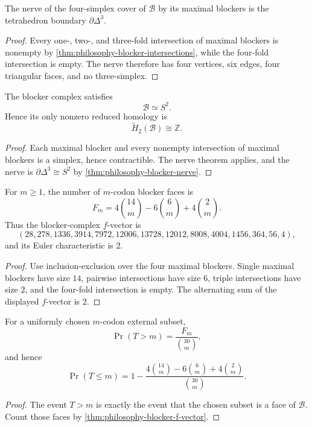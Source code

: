 \begin{theorem}
\label{thm:philosophy-blocker-nerve}
The nerve of the four-simplex cover of $\mathcal{B}$ by its maximal
blockers is the tetrahedron boundary $\partial\Delta^{3}$.
\end{theorem}
\begin{proof}
Every one-, two-, and three-fold intersection of maximal blockers is
nonempty by \autoref{thm:philosophy-blocker-intersections}, while the
four-fold intersection is empty. The nerve therefore has four vertices,
six edges, four triangular faces, and no three-simplex.
\end{proof}

\begin{corollary}
\label{cor:philosophy-blocker-homotopy-type}
The blocker complex satisfies
$$
  \mathcal{B}\simeq S^{2}.
$$
Hence its only nonzero reduced homology is
$$
  \widetilde{H}_{2}(\mathcal{B})\cong\mathbb{Z}.
$$
\end{corollary}
\begin{proof}
Each maximal blocker and every nonempty intersection of maximal
blockers is a simplex, hence contractible. The nerve theorem applies,
and the nerve is $\partial\Delta^{3}\cong S^{2}$ by
\autoref{thm:philosophy-blocker-nerve}.
\end{proof}

\begin{theorem}
\label{thm:philosophy-blocker-f-vector}
For $m\geq 1$, the number of $m$-codon blocker faces is
$$
  F_{m}
  =
  4\binom{14}{m}
  -
  6\binom{6}{m}
  +
  4\binom{2}{m}.
$$
Thus the blocker-complex $f$-vector is
$$
  (28,278,1336,3914,7972,12006,13728,
  12012,8008,4004,1456,364,56,4),
$$
and its Euler characteristic is $2$.
\end{theorem}
\begin{proof}
Use inclusion-exclusion over the four maximal blockers. Single maximal
blockers have size $14$, pairwise intersections have size $6$, triple
intersections have size $2$, and the four-fold intersection is empty.
The alternating sum of the displayed $f$-vector is $2$.
\end{proof}

\begin{corollary}
\label{cor:philosophy-blocker-probability-tail}
For a uniformly chosen $m$-codon external subset,
$$
  \Pr(T>m)
  =
  \frac{F_{m}}{\binom{30}{m}},
$$
and hence
$$
  \Pr(T\leq m)
  =
  1-
  \frac{
  4\binom{14}{m}
  -
  6\binom{6}{m}
  +
  4\binom{2}{m}
  }{\binom{30}{m}}.
$$
\end{corollary}
\begin{proof}
The event $T>m$ is exactly the event that the chosen subset is a face of
$\mathcal{B}$. Count those faces by
\autoref{thm:philosophy-blocker-f-vector}.
\end{proof}

